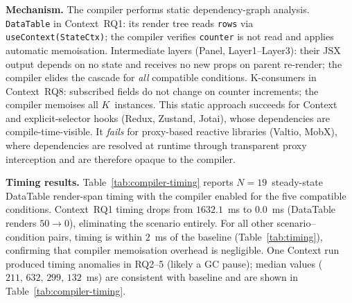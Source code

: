 \documentclass[conference]{IEEEtran}
\newcommand{\code}[1]{\texttt{\small #1}}
\begin{document}
\textbf{Mechanism.}
The compiler performs static dependency-graph analysis.
\code{DataTable} in Context~RQ1: its render tree reads
\code{rows} via \code{useContext(StateCtx)}; the compiler
verifies \code{counter} is not read and applies automatic memoisation.
Intermediate layers (Panel, Layer1--Layer3): their JSX output depends
on no state and receives no new props on parent re-render; the compiler
elides the cascade for \emph{all} compatible conditions.
K-consumers in Context~RQ8: subscribed fields do not change on counter
increments; the compiler memoises all $K$~instances.
This static approach succeeds for Context and explicit-selector hooks
(Redux, Zustand, Jotai), whose dependencies are compile-time-visible.
It \emph{fails} for proxy-based reactive libraries (Valtio, MobX),
where dependencies are resolved at runtime through transparent proxy
interception and are therefore opaque to the compiler.

\textbf{Timing results.}
Table~\ref{tab:compiler-timing} reports $N{=}19$~steady-state
DataTable render-span timing with the compiler enabled for the five
compatible conditions.  Context~RQ1 timing drops from $1632.1$~ms to
$0.0$~ms (DataTable renders $50{\to}0$), eliminating the scenario
entirely.  For all other scenario--condition pairs, timing is within
$2$~ms of the baseline (Table~\ref{tab:timing}), confirming that
compiler memoisation overhead is negligible.
One Context run produced timing anomalies in RQ2--5 (likely a GC
pause); median values ($211,\,632,\,299,\,132$~ms) are consistent
with baseline and are shown in
Table~\ref{tab:compiler-timing}.
\end{document}
